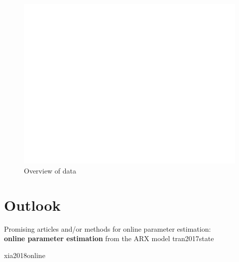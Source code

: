\begin{figure}[!ht]
\includegraphics{matplotoverview}
\caption{\label{fig:overview} Overview of data}
\end{figure}

\chapter{Outlook}

Promising articles and/or methods for online parameter estimation: \\ 

\textbf{online parameter estimation} from the ARX model {tran2017state}

\cite{wang2021augmented}
{xia2018online}
